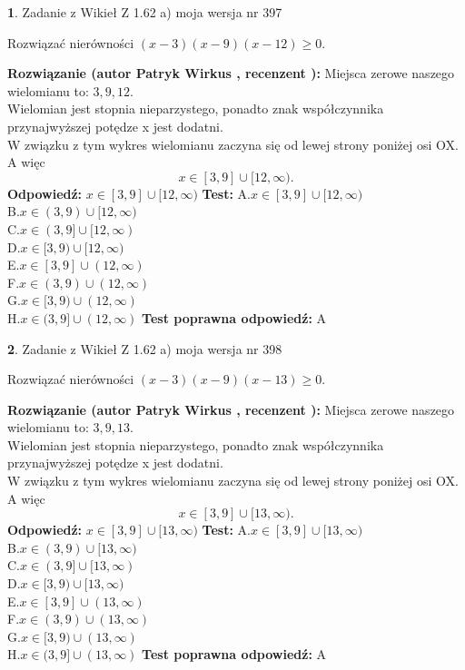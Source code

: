 \documentclass[12pt, a4paper]{article}
\theoremstyle{definition} %
\newtheorem{zad}{}
\newcommand{\zadStart}[1]{\begin{zad}#1\newline}
\newcommand{\zadStop}{\end{zad}}
\newcommand{\rozwStart}[2]{\noindent \textbf{Rozwiązanie (autor #1 , recenzent #2): }\newline}
\newcommand{\rozwStop}{\newline}
\newcommand{\odpStart}{\noindent \textbf{Odpowiedź:}\newline}
\newcommand{\odpStop}{\newline}
\newcommand{\testStart}{\noindent \textbf{Test:}\newline}
\newcommand{\testStop}{\newline}
\newcommand{\kluczStart}{\noindent \textbf{Test poprawna odpowiedź:}\newline}
\newcommand{\kluczStop}{\newline}
\begin{document}
\zadStart{Zadanie z Wikieł Z 1.62 a) moja wersja nr 397}

Rozwiązać nierówności $(x-3)(x-9)(x-12)\ge0$.
\zadStop
\rozwStart{Patryk Wirkus}{}
Miejsca zerowe naszego wielomianu to: $3, 9, 12$.\\
Wielomian jest stopnia nieparzystego, ponadto znak współczynnika przy\linebreak najwyższej potędze x jest dodatni.\\ W związku z tym wykres wielomianu zaczyna się od lewej strony poniżej osi OX. A więc $$x \in [3,9] \cup [12,\infty).$$
\rozwStop
\odpStart
$x \in [3,9] \cup [12,\infty)$
\odpStop
\testStart
A.$x \in [3,9] \cup [12,\infty)$\\
B.$x \in (3,9) \cup [12,\infty)$\\
C.$x \in (3,9] \cup [12,\infty)$\\
D.$x \in [3,9) \cup [12,\infty)$\\
E.$x \in [3,9] \cup (12,\infty)$\\
F.$x \in (3,9) \cup (12,\infty)$\\
G.$x \in [3,9) \cup (12,\infty)$\\
H.$x \in (3,9] \cup (12,\infty)$
\testStop
\kluczStart
A
\kluczStop



\zadStart{Zadanie z Wikieł Z 1.62 a) moja wersja nr 398}

Rozwiązać nierówności $(x-3)(x-9)(x-13)\ge0$.
\zadStop
\rozwStart{Patryk Wirkus}{}
Miejsca zerowe naszego wielomianu to: $3, 9, 13$.\\
Wielomian jest stopnia nieparzystego, ponadto znak współczynnika przy\linebreak najwyższej potędze x jest dodatni.\\ W związku z tym wykres wielomianu zaczyna się od lewej strony poniżej osi OX. A więc $$x \in [3,9] \cup [13,\infty).$$
\rozwStop
\odpStart
$x \in [3,9] \cup [13,\infty)$
\odpStop
\testStart
A.$x \in [3,9] \cup [13,\infty)$\\
B.$x \in (3,9) \cup [13,\infty)$\\
C.$x \in (3,9] \cup [13,\infty)$\\
D.$x \in [3,9) \cup [13,\infty)$\\
E.$x \in [3,9] \cup (13,\infty)$\\
F.$x \in (3,9) \cup (13,\infty)$\\
G.$x \in [3,9) \cup (13,\infty)$\\
H.$x \in (3,9] \cup (13,\infty)$
\testStop
\kluczStart
A
\kluczStop
\end{document}

